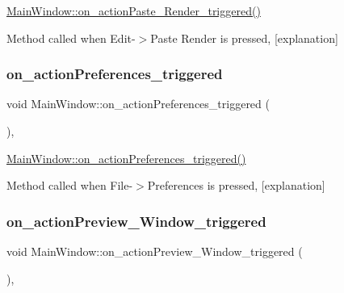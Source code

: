 \hyperlink{class_main_window_a8587cd1f94682b6ac53b321b632e1220}{Main\+Window\+::on\+\_\+action\+Paste\+\_\+\+Render\+\_\+triggered()} 

Method called when Edit-\/$>$Paste Render is pressed, \mbox{[}explanation\mbox{]} \mbox{\label{class_main_window_a2e63d199e37300ac181f39c3a7a7d78b}} 
\subsubsection{\texorpdfstring{on\+\_\+action\+Preferences\+\_\+triggered}{on\_actionPreferences\_triggered}}
{\footnotesize\ttfamily void Main\+Window\+::on\+\_\+action\+Preferences\+\_\+triggered (\begin{DoxyParamCaption}{ }\end{DoxyParamCaption})\hspace{0.3cm}{\ttfamily [private]}, {\ttfamily [slot]}}



\hyperlink{class_main_window_a2e63d199e37300ac181f39c3a7a7d78b}{Main\+Window\+::on\+\_\+action\+Preferences\+\_\+triggered()} 

Method called when File-\/$>$Preferences is pressed, \mbox{[}explanation\mbox{]} \mbox{\label{class_main_window_ad39efdb57cad0ee03b2491037fa6b5c0}} 
\subsubsection{\texorpdfstring{on\+\_\+action\+Preview\+\_\+\+Window\+\_\+triggered}{on\_actionPreview\_Window\_triggered}}
{\footnotesize\ttfamily void Main\+Window\+::on\+\_\+action\+Preview\+\_\+\+Window\+\_\+triggered (\begin{DoxyParamCaption}{ }\end{DoxyParamCaption})\hspace{0.3cm}{\ttfamily [private]}, {\ttfamily [slot]}}



